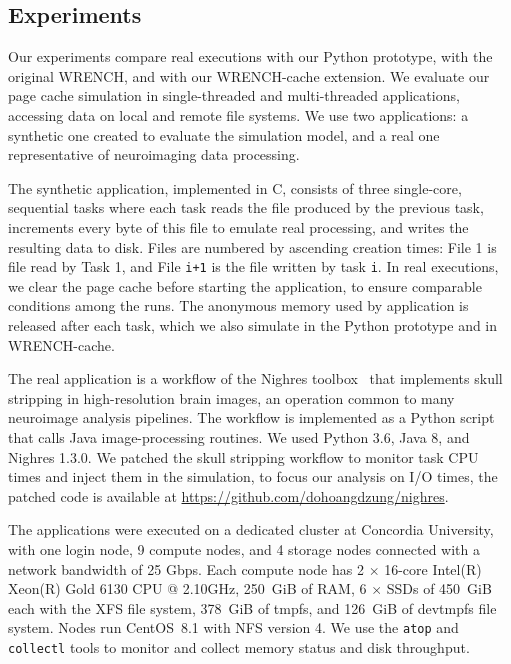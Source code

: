 \documentclass[conference]{IEEEtran}
\newcommand{\wrench}{WRENCH\xspace}
\begin{document}
        \subsection{Experiments}

        Our experiments compare real executions with our Python prototype,
        with the original \wrench, and with our \wrench-cache extension. We
        evaluate our page cache simulation in single-threaded and
        multi-threaded applications, accessing data on local and remote
        file systems. We use two applications: a synthetic one created to
        evaluate the simulation model, and a real one representative of
        neuroimaging data processing.

        The synthetic application, implemented in C, consists of three single-core,
        sequential tasks where each task reads the file produced by the
        previous task, increments every byte of this file to emulate real
        processing, and writes the resulting data to disk. Files are
        numbered by ascending creation times: File 1 is file read by Task 1, and File \texttt{i+1} is the file
        written by task \texttt{i}. In real executions, we clear the page
        cache before starting the application, to ensure comparable
        conditions among the runs. The anonymous memory used by application
        is released after each task, which we also simulate in the Python
        prototype and in WRENCH-cache.
        
        The real application is a workflow of the Nighres
        toolbox~\cite{huntenburg2018nighres} that implements skull
        stripping in high-resolution brain images, an operation common to
        many neuroimage analysis pipelines. The workflow is implemented as a Python
        script that calls Java image-processing routines. We used Python
        3.6, Java 8, and Nighres 1.3.0. We patched the
        skull stripping workflow to monitor task CPU times and inject them
        in the simulation, to focus our analysis on I/O times, the patched code is 
        available at \url{https://github.com/dohoangdzung/nighres}. 

        The applications were executed on a dedicated cluster at
        Concordia University, with one login node, 9 compute nodes, and 4
        storage nodes connected with a network bandwidth of 25 Gbps. Each
        compute node has 2 $\times$ 16-core Intel(R) Xeon(R) Gold 6130 CPU
        @ 2.10GHz, 250~GiB of RAM, 6 $\times$ SSDs of 450~GiB each with the XFS
        file system, 378~GiB of tmpfs, and 126~GiB of devtmpfs file system.
        Nodes run CentOS~8.1 with NFS version 4. We use the \texttt{atop}
        and \texttt{collectl} tools to monitor and collect memory status
        and disk throughput.
\end{document}

